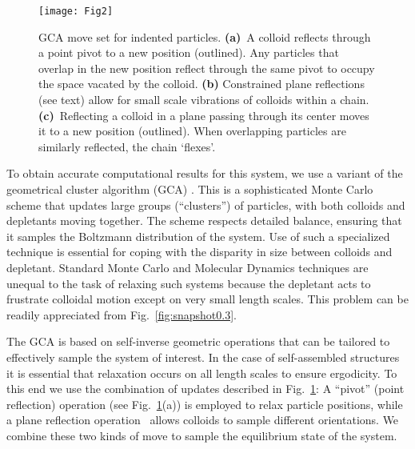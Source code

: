 \documentclass[10pt,onside,singlecolumn]{article}
\newcommand{\figurewidth}{0.95\textwidth}
\begin{document}
\begin{figure} 
\texttt{[image: Fig2]}
%
  \caption{GCA move set for indented particles. {\bf (a)}~A
    colloid reflects through a point pivot to a new position
    (outlined). Any particles that overlap in the new position reflect
    through the same pivot to occupy the space vacated by the
    colloid. {\bf (b)} Constrained plane reflections  (see text) 
    allow for small scale vibrations of colloids within a chain. {\bf (c)}~Reflecting a colloid
    in a plane passing through its center moves it to a new position (outlined). When overlapping particles are similarly reflected, the
     chain `flexes'.}
\label{fig:GCA}
\end{figure}



To obtain accurate computational results for this system, we use a
variant of the geometrical cluster algorithm (GCA) \cite{Liu2004}.
This is a sophisticated Monte Carlo scheme that 
 updates large groups (``clusters'') of
particles, with both colloids and depletants moving together.  
The scheme respects detailed balance, ensuring that it samples the
Boltzmann distribution of the system.  Use of
such a specialized technique is essential for coping with the
disparity in size between colloids and depletant.  Standard Monte
Carlo and Molecular Dynamics techniques are unequal to the task of
relaxing such systems because the depletant acts to frustrate
colloidal motion except on very small length scales. This problem can
be readily appreciated from Fig.~\ref{fig:snapshot0.3}.


The GCA is based on self-inverse geometric operations that can be
tailored to effectively sample the system of interest.  In the case of
self-assembled structures it is essential that relaxation occurs on
all length scales to ensure ergodicity. To this end we use the
combination of updates described in Fig.~\ref{fig:GCA}: A ``pivot''
(point reflection) operation (see Fig.~\ref{fig:GCA}(a)) is employed to
relax particle positions, while a plane reflection
operation~\cite{sinkovits:144111} allows colloids to sample different
orientations.  We combine these two kinds of move to sample the equilibrium
state of the system.  
\end{document}
